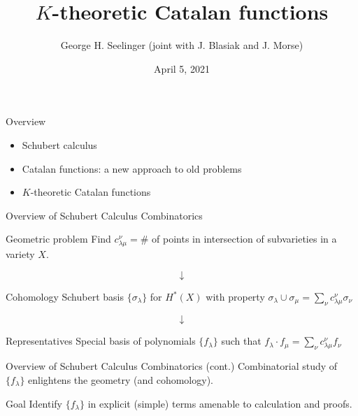 \documentclass{beamer}
\title[\(K\)-theory Catalans]{\(K\)-theoretic Catalan functions} %
\author[George H. Seelinger]{George H. Seelinger (joint with
  J. Blasiak and J. Morse)} %
\institute[UVA] %
{
\textit{ghs9ae@virginia.edu}\\ %
  {\tt arXiv:2010.01759}\\
  \medskip
UVA Algebra Seminar\\ %
}
\date{April 5, 2021} %
\DeclareMathOperator{\Gr}{Gr}
\newcommand{\cupprod}{\cup}
\begin{document}
\begin{frame}
\titlepage %
\end{frame}
\begin{frame}{Overview}
  \begin{itemize}
  \item Schubert calculus
  \item Catalan functions: a new approach to old problems
  \item \(K\)-theoretic Catalan functions
  \end{itemize}
\end{frame}
\begin{frame}{Overview of Schubert Calculus Combinatorics}
  \begin{block}{Geometric problem}
    Find \(c_{\lambda \mu}^\nu = \#\) of points in
    intersection of subvarieties in a variety \(X\). \pause
  \end{block}
  \[
    \downarrow
  \]
  \begin{block}{Cohomology}
    Schubert basis \(\{\sigma_\lambda\}\) for \(H^*(X)\) with property \(\sigma_\lambda \cupprod \sigma_\mu = \sum_\nu c_{\lambda \mu}^\nu \sigma_\nu\) \pause 
\end{block}
\[
  \downarrow
\]
\begin{block}{Representatives}
  Special basis of polynomials \(\{f_\lambda\}\) such that \(f_\lambda \cdot f_\mu = \sum_\nu c_{\lambda \mu}^\nu f_\nu\)
\end{block}
\end{frame}
\begin{frame}{Overview of Schubert Calculus Combinatorics (cont.)}
  Combinatorial study of \(\{f_\lambda\}\) enlightens the geometry
  (and cohomology). %
  \begin{alertblock}{Goal}
    Identify \(\{f_\lambda\}\) in explicit (simple) terms amenable to
    calculation and proofs.
  \end{alertblock}
\end{frame}
\end{document}
